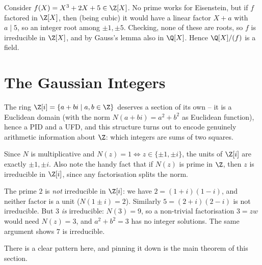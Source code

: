 \begin{example}
	Consider $f(X) = X^3 + 2X + 5 \in \Z[X]$. No prime works for Eisenstein, but if $f$ factored in $\Z[X]$, then (being cubic) it would have a linear factor $X + a$ with $a \mid 5$, so an integer root among $\pm 1, \pm 5$. Checking, none of these are roots, so $f$ is irreducible in $\Z[X]$, and by Gauss's lemma also in $\Q[X]$. Hence $\Q[X]/(f)$ is a field.
\end{example}

\section{The Gaussian Integers}

The ring $\Z[i] = \{a + bi \mid a, b \in \Z\}$ deserves a section of its own -- it is a Euclidean domain (with the norm $N(a + bi) = a^2 + b^2$ as Euclidean function), hence a PID and a UFD, and this structure turns out to encode genuinely arithmetic information about $\Z$: which integers are sums of two squares.

Since $N$ is multiplicative and $N(z) = 1 \iff z \in \{\pm 1, \pm i\}$, the units of $\Z[i]$ are exactly $\pm 1, \pm i$. Also note the handy fact that if $N(z)$ is prime in $\Z$, then $z$ is irreducible in $\Z[i]$, since any factorisation splits the norm.

\begin{example}
	The prime $2$ is \emph{not} irreducible in $\Z[i]$: we have $2 = (1 + i)(1 - i)$, and neither factor is a unit ($N(1 \pm i) = 2$). Similarly $5 = (2 + i)(2 - i)$ is not irreducible. But $3$ \emph{is} irreducible: $N(3) = 9$, so a non-trivial factorisation $3 = zw$ would need $N(z) = 3$, and $a^2 + b^2 = 3$ has no integer solutions. The same argument shows $7$ is irreducible.
\end{example}

There is a clear pattern here, and pinning it down is the main theorem of this section.

